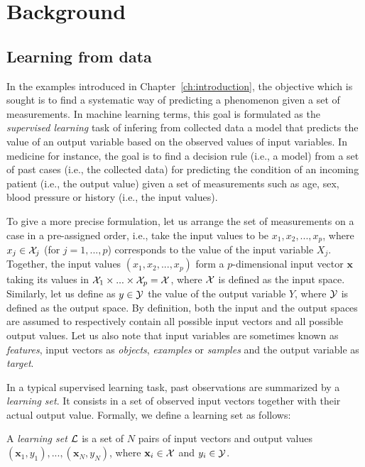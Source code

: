 \chapter{Background}\label{ch:background}

\section{Learning from data}

In the examples introduced in Chapter~\ref{ch:introduction}, the objective
which is sought is to find a systematic way of predicting a phenomenon given a
set of measurements. In machine learning terms, this goal is formulated as the
{\it supervised learning} task of infering from collected data a model that
predicts the value of an output variable based on the observed values of input
variables. In medicine for instance, the goal is to find a decision rule (i.e.,
a model) from a set of past cases (i.e., the collected data) for predicting the
condition of an incoming patient (i.e., the output value) given a set of
measurements such as age, sex, blood pressure or history (i.e., the input
values).

To give a more precise formulation, let us arrange the set of measurements on a
case in a pre-assigned order, i.e., take the input values to be $x_1, x_2, ...,
x_p$, where $x_j \in {\cal X}_j$ (for $j = 1, ..., p$) corresponds to the value
of the input variable $X_j$. Together, the input values $(x_1, x_2, ..., x_p)$
form a $p$-dimensional input vector $\mathbf{x}$ taking its values in ${\cal
X}_1 \times ... \times {\cal X}_p = {\cal X}$, where ${\cal X}$ is defined as
the input space. Similarly, let us define as $y \in {\cal Y}$ the value of the
output variable $Y$, where ${\cal Y}$ is defined as the output space. By
definition, both the input and the output spaces are assumed to respectively
contain all possible input vectors and all possible output values. Let
us also note that input variables are sometimes known as {\it features}, input
vectors as {\it objects}, {\it examples} or {\it samples} and the output
variable as {\it target}.

In a typical supervised learning task, past observations are summarized by a
{\it learning set}. It consists in a set of observed input vectors together
with their actual output value. Formally, we define a learning set as follows:

\begin{definition}
A \emph{learning set} ${\cal L}$ is a set of $N$
pairs of input vectors and output values $(\mathbf{x}_1, y_1), ...,
(\mathbf{x}_N, y_N)$, where $\mathbf{x}_i \in {\cal X}$ and $y_i \in {\cal Y}$.
\end{definition}

